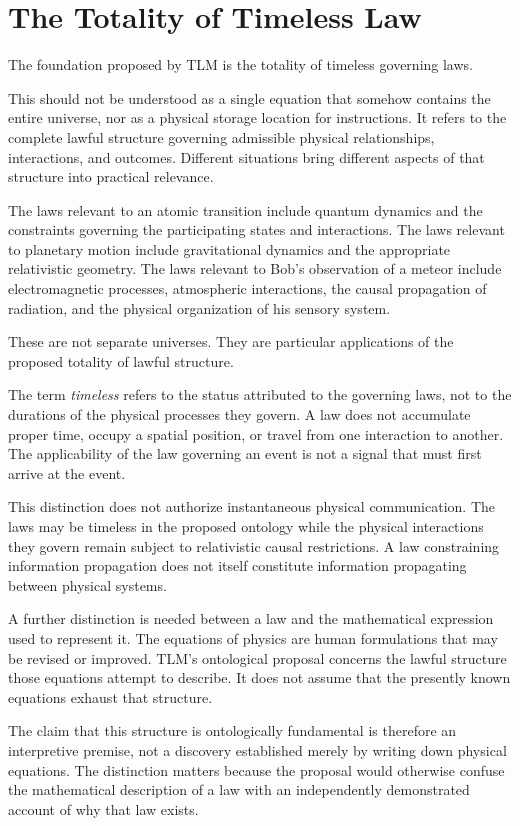 \documentclass[12pt,onecolumn]{article}
\begin{document}
\section{The Totality of Timeless Law}

The foundation proposed by TLM is the totality of timeless governing laws.

This should not be understood as a single equation that somehow contains the entire universe, nor as a physical storage location for instructions. It refers to the complete lawful structure governing admissible physical relationships, interactions, and outcomes. Different situations bring different aspects of that structure into practical relevance.

The laws relevant to an atomic transition include quantum dynamics and the constraints governing the participating states and interactions. The laws relevant to planetary motion include gravitational dynamics and the appropriate relativistic geometry. The laws relevant to Bob's observation of a meteor include electromagnetic processes, atmospheric interactions, the causal propagation of radiation, and the physical organization of his sensory system.

These are not separate universes. They are particular applications of the proposed totality of lawful structure.

The term \emph{timeless} refers to the status attributed to the governing laws, not to the durations of the physical processes they govern. A law does not accumulate proper time, occupy a spatial position, or travel from one interaction to another. The applicability of the law governing an event is not a signal that must first arrive at the event.

This distinction does not authorize instantaneous physical communication. The laws may be timeless in the proposed ontology while the physical interactions they govern remain subject to relativistic causal restrictions. A law constraining information propagation does not itself constitute information propagating between physical systems.

A further distinction is needed between a law and the mathematical expression used to represent it. The equations of physics are human formulations that may be revised or improved. TLM's ontological proposal concerns the lawful structure those equations attempt to describe. It does not assume that the presently known equations exhaust that structure.

The claim that this structure is ontologically fundamental is therefore an interpretive premise, not a discovery established merely by writing down physical equations. The distinction matters because the proposal would otherwise confuse the mathematical description of a law with an independently demonstrated account of why that law exists.
\end{document}
